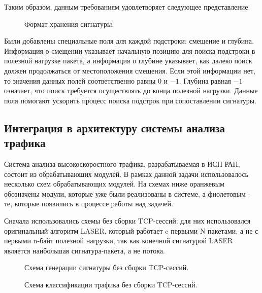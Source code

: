 Таким образом, данным требованиям удовлетворяет следующее представление:

\begin{figure}[H]
    \begin{center}
        
        \caption{Формат хранения сигнатуры.}
    \end{center}
\end{figure}

Были добавлены специальные поля для каждой подстроки: смещение и глубина.
Информация о смещении указывает начальную позицию для поиска подстроки в полезной нагрузке пакета,
а информация о глубине указывает, как далеко поиск должен продолжаться от местоположения смещения.
Если этой информации нет, то значения данных полей соответственно равны $0$ и $-1$.
Глубина равная $-1$ означает, что поиск требуется осуществлять до конца полезной нагрузки.
Данные поля помогают ускорить процесс поиска подстрок при сопоставлении сигнатуры.

\subsection{Интеграция в архитектуру системы анализа трафика}

Система анализа высокоскоростного трафика, разрабатываемая в ИСП РАН, состоит из обрабатывающих модулей. В рамках данной задачи использовалось несколько схем обрабатывающих модулей.
На схемах ниже оранжевым обозначены модули, которые уже были реализованы в системе, а фиолетовым - те, которые появились в процессе работы над задачей.

Сначала использовались схемы без сборки TCP-сессий: для них использовался оригинальный алгоритм LASER,
который работает c первыми N пакетами, а не с первыми n-байт полезной нагрузки, так как конечной сигнатурой LASER является наибольшая сигнатура-пакета, а не потока.

\begin{figure}[H]
    \begin{center}
        
        \caption{Схема генерации сигнатуры без сборки TCP-сессий.}
    \end{center}
\end{figure}

\begin{figure}[H]
    \begin{center}
        
        \caption{Схема классификации трафика без сборки TCP-сессий.}
    \end{center}
\end{figure}

